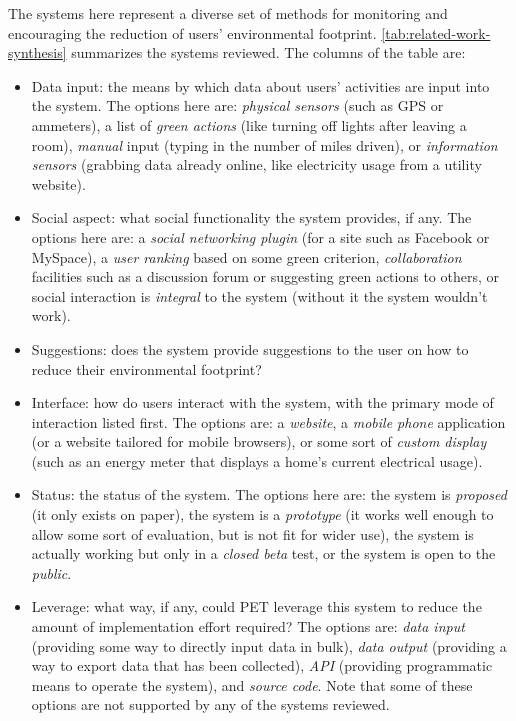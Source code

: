 The systems here represent a diverse set of methods for monitoring and encouraging the reduction of users' environmental footprint. \autoref{tab:related-work-synthesis} summarizes the systems reviewed. The columns of the table are:

\begin{itemize}
	\item Data input: the means by which data about users' activities are input into the system. The options here are: \emph{physical sensors} (such as GPS or ammeters), a list of \emph{green actions} (like turning off lights after leaving a room), \emph{manual} input (typing in the number of miles driven), or \emph{information sensors} (grabbing data already online, like electricity usage from a utility website).
	\item Social aspect: what social functionality the system provides, if any.  The options here are: a \emph{social networking plugin} (for a site such as Facebook or MySpace), a \emph{user ranking} based on some green criterion, \emph{collaboration} facilities such as a discussion forum or suggesting green actions to others, or social interaction is \emph{integral} to the system (without it the system wouldn't work).
	\item Suggestions: does the system provide suggestions to the user on how to reduce their environmental footprint?
	\item Interface: how do users interact with the system, with the primary mode of interaction listed first. The options are: a \emph{website}, a \emph{mobile phone} application (or a website tailored for mobile browsers), or some sort of \emph{custom display} (such as an energy meter that displays a home's current electrical usage).
	\item Status: the status of the system. The options here are: the system is \emph{proposed} (it only exists on paper), the system is a \emph{prototype} (it works well enough to allow some sort of evaluation, but is not fit for wider use), the system is actually working but only in a \emph{closed beta} test, or the system is open to the \emph{public}.
	\item Leverage: what way, if any, could PET leverage this system to reduce the amount of implementation effort required? The options are: \emph{data input} (providing some way to directly input data in bulk), \emph{data output} (providing a way to export data that has been collected), \emph{API} (providing programmatic means to operate the system), and \emph{source code}. Note that some of these options are not supported by any of the systems reviewed.
\end{itemize}

